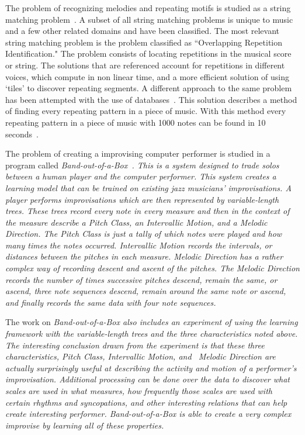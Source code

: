 \documentclass[12pt]{ucthesis}
\begin{document}
The problem of recognizing melodies and repeating motifs is studied as a string matching problem~\cite{MelodicRecognition}. A subset of all string matching problems is unique to music and a few other related domains and have been classified. The most relevant string matching problem is the problem classified as ``Overlapping Repetition Identification." The problem consists of locating repetitions in the musical score or string. The solutions that are referenced account for repetitions in different voices, which compute in non linear time, and a more efficient solution of using `tiles' to discover repeating segments.  A different approach to the same problem has been attempted with the use of databases~\cite{musicDB}. This solution describes a method of finding every repeating pattern in a piece of music. With this method every repeating pattern in a piece of music with 1000 notes can be found in 10 seconds~\cite{musicDB}.

The problem of creating a improvising computer performer is studied in a program called \em{Band-out-of-a-Box}\em~\cite{bob}. This is a system designed to trade solos between a human player and the computer performer. This system creates a learning model that can be trained on existing jazz musicians' improvisations. A player performs improvisations which are then represented by variable-length trees. These trees record every note in every measure and then in the context of the measure describe a \em{Pitch Class, }\em an \em{Intervallic Motion, }\em and a \em{Melodic Direction. }\em The \em{Pitch Class }\em is just a tally of which notes were played and how many times the notes occurred. \em{Intervallic Motion }\em records the intervals, or distances between the pitches in each measure.  \em{Melodic Direction }\em has a rather complex way of recording descent and ascent of the pitches.  The \em{Melodic Direction }\em records the number of times successive pitches descend, remain the same, or ascend, three note sequences descend, remain around the same note or ascend, and finally records the same data with four note sequences. 

The work on \em{Band-out-of-a-Box }\em also includes an experiment of using the learning framework with the variable-length trees and the three characteristics noted above. The interesting conclusion drawn from the experiment is that these three characteristics, \em{Pitch Class, Intervallic Motion, }\em and  ~\em{Melodic Direction }\em are actually surprisingly useful at describing the activity and motion of a performer's improvisation. Additional processing can be done over the data to discover what scales are used in what measures, how frequently those scales are used with certain rhythms and syncopations, and other interesting relations that can help create interesting performer.  \em{Band-out-of-a-Box }\em is able to create a very complex improvise by learning all of these properties.
\end{document}
